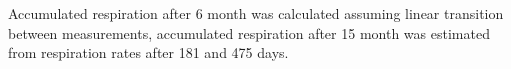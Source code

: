 \documentclass[authoryear,preprint,review,12pt]{elsarticle}
\begin{document}
                                                                                                                                                                                                                                                                                                                                                                                                                                                                                                                                                                                                                                                                                                                                                                                                                                                                                                                                                                                                                                                                                                                              Accumulated respiration after 6 month was calculated assuming linear transition between measurements, accumulated respiration after 15 month was estimated from respiration rates after 181 and 475 days.
\end{document}
